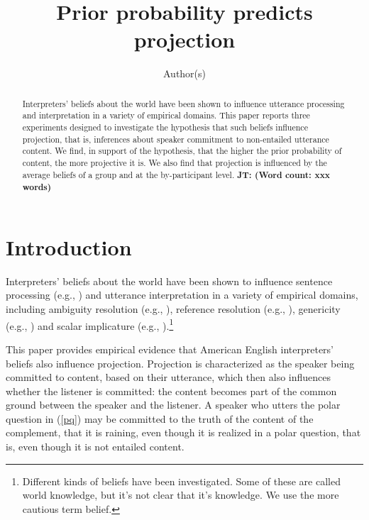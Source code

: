 \documentclass[11pt,fleqn]{article}
\title{Prior probability predicts projection}
\author{Author(s)}
\newcommand{\6}{\mbox{$[\hspace*{-.6mm}[$}}
\newcommand{\9}{\mbox{$]\hspace*{-.6mm}]$}}
\newcommand{\jt}[1]{\textbf{\color{blue}JT: #1}}
\begin{document}

\maketitle

\begin{abstract}

Interpreters' beliefs about the world have been shown to influence utterance processing and interpretation in a variety of empirical domains. This paper reports three experiments designed to investigate the hypothesis that such beliefs influence projection, that is, inferences about speaker commitment to non-entailed utterance content. We find, in support of the hypothesis, that the higher the prior probability of content, the more projective it is. We also find that projection is influenced by the average beliefs of a group and at the by-participant level. \jt{(Word count: xxx words)}

\end{abstract}

\section{Introduction}

Interpreters' beliefs about the world have been shown to influence sentence processing (e.g., \citealt*{chambers-etal02,hagoort-etal2004,hald-etal2007}) and utterance interpretation in a variety of empirical domains, including ambiguity resolution (e.g., \citealt*{chambers-etal04,bicknell-rohde2009}), reference resolution (e.g., \citealt{hanna-tanenhaus04}), genericity (e.g., \citealt{tessler-goodman2019}) and scalar implicature (e.g., \citealt*{degen-etal2015}).\footnote{Different kinds of beliefs have been investigated. Some of these are called world knowledge, but it's not clear that it's knowledge. We use the more cautious term belief.} 


This paper provides empirical evidence that American English interpreters' beliefs also influence projection. Projection is characterized as the speaker being committed to content, based on their utterance, which then also influences whether the listener is committed: the content becomes part of the common ground between the speaker and the listener. A speaker who utters the polar question in (\ref{pq}) may be committed to the truth of the content of the complement, that it is raining, even though it is realized in a polar question, that is, even though it is not entailed content.
\end{document}
